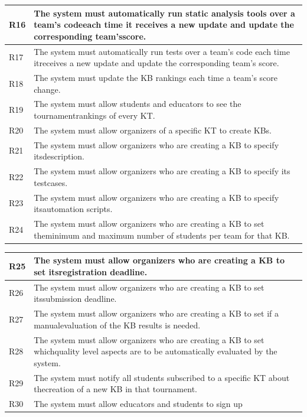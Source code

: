 \documentclass[11pt]{report}
\begin{document}
\begin{table}[]
\begin{tabular}{|l|p{130mm}|}
R16 & The system must automatically run static analysis tools over a team’s codeeach time it receives a new update and update the corresponding team’sscore. \\ \hline
R17 & The system must automatically run tests over a team’s code each time itreceives a new update and update the corresponding team’s score. \\ \hline
R18 & The system must update the KB rankings each time a team’s score change. \\ \hline
R19 & The system must allow students and educators to see the tournamentrankings of every KT. \\ \hline
R20 & The system must allow organizers of a specific KT to create KBs. \\ \hline
R21 & The system must allow organizers who are creating a KB to specify itsdescription. \\ \hline
R22 & The system must allow organizers who are creating a KB to specify its testcases. \\ \hline
R23 & The system must allow organizers who are creating a KB to specify itsautomation scripts. \\ \hline
R24 & The system must allow organizers who are creating a KB to set theminimum and maximum number of students per team for that KB. \\ \hline
\end{tabular}
\end{table}

\begin{table}[]
\begin{tabular}{|l|p{130mm}|}
\hline
R25 & The system must allow organizers who are creating a KB to set itsregistration deadline. \\ \hline
R26 & The system must allow organizers who are creating a KB to set itssubmission deadline. \\ \hline
R27 & The system must allow organizers who are creating a KB to set if a manualevaluation of the KB results is needed. \\ \hline
R28 & The system must allow organizers who are creating a KB to set whichquality level aspects are to be automatically evaluated by the system. \\ \hline
R29 & The system must notify all students subscribed to a specific KT about thecreation of a new KB in that tournament. \\ \hline
R30 & The system must allow educators and students to sign up \\ \hline
\end{tabular}
\end{table}
\end{document}
